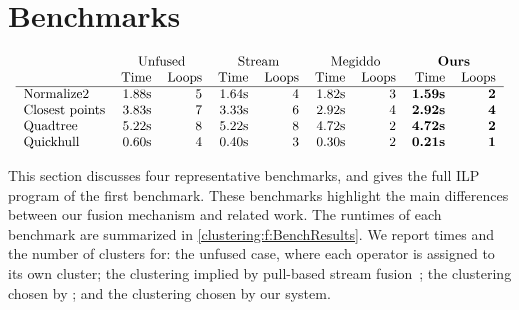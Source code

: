 \section{Benchmarks}
\label{clustering:s:Benchmarks}

\begin{table}
$$\begin{array}{c}

\begin{tabular}{lrrrrrrrr}
                & \multicolumn{2}{c}{Unfused}         & \multicolumn{2}{c}{Stream}
                & \multicolumn{2}{c}{Megiddo} &\multicolumn{2}{c}{\textbf{Ours}} \\
                & Time & Loops   & Time & Loops      & Time & Loops & Time & Loops   \\
\hline
Normalize2      & 1.88s & 5      & 1.64s & 4          & 1.82s & 3  & \textbf{1.59s} & \textbf{2}\\
Closest points  & 3.83s & 7      & 3.33s & 6          & 2.92s & 4  & \textbf{2.92s} & \textbf{4}\\
Quadtree        & 5.22s & 8      & 5.22s & 8          & 4.72s & 2  & \textbf{4.72s} & \textbf{2}\\
Quickhull       & 0.60s & 4      & 0.40s & 3          & 0.30s & 2  & \textbf{0.21s} & \textbf{1}\\
\end{tabular}

\end{array}$$
\caption{Benchmark results}
\label{clustering:f:BenchResults}
\end{table}

This section discusses four representative benchmarks, and gives the full ILP program of the first benchmark.
These benchmarks highlight the main differences between our fusion mechanism and related work.
The runtimes of each benchmark are summarized in \cref{clustering:f:BenchResults}.
We report times and the number of clusters for: the unfused case, where each operator is assigned to its own cluster; the clustering implied by pull-based stream fusion~\cite{coutts2007stream}; the clustering chosen by \citet{megiddo1998optimal}; and the clustering chosen by our system. 

